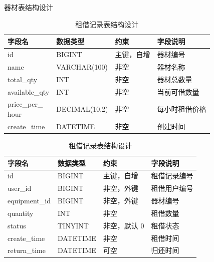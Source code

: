 \begin{table}[htbp]
\centering
\caption{器材表结构设计}
\label{tab:equipment-table}
\small
\begin{tabularx}{\textwidth}{p{2.2cm}p{2.7cm}p{2.4cm}X}
\toprule
字段名 & 数据类型 & 约束 & 字段说明 \\
\midrule
id & BIGINT & 主键，自增 & 器材编号 \\
name & VARCHAR(100) & 非空 & 器材名称 \\
total\_qty & INT & 非空 & 器材总数量 \\
available\_qty & INT & 非空 & 当前可借数量 \\
\makecell[l]{price\_per\_\\hour} & DECIMAL(10,2) & 非空 & 每小时租借价格 \\
create\_time & DATETIME & 非空 & 创建时间 \\
\bottomrule
\end{tabularx}

\vspace{1.5em} %

\caption{租借记录表结构设计}
\label{tab:rental-table}
\small
\begin{tabularx}{\textwidth}{p{2.2cm}p{2.7cm}p{2.4cm}X}
\toprule
字段名 & 数据类型 & 约束 & 字段说明 \\
\midrule
id & BIGINT & 主键，自增 & 租借记录编号 \\
user\_id & BIGINT & 非空，外键 & 租借用户编号 \\
equipment\_id & BIGINT & 非空，外键 & 器材编号 \\
quantity & INT & 非空 & 租借数量 \\
status & TINYINT & 非空，默认 0 & 租借状态 \\
create\_time & DATETIME & 非空 & 租借时间 \\
return\_time & DATETIME & 可空 & 归还时间 \\
\bottomrule
\end{tabularx}
\end{table}
